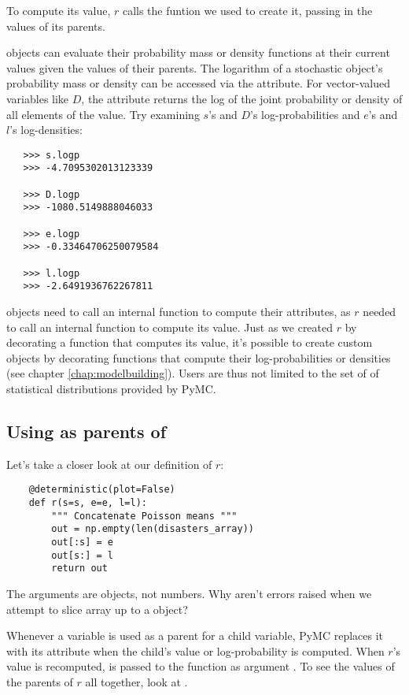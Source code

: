 To compute its value, $r$ calls the funtion we used to create it, passing in the values of its parents.

 objects can evaluate their probability mass or density functions at their current values given the values of their parents. The logarithm of a stochastic object's probability mass or density can be accessed via the  attribute. For vector-valued variables like $D$, the  attribute returns the log of the joint probability or density of all elements of the value. Try examining $s$'s and $D$'s log-probabilities and $e$'s and $l$'s log-densities:
\begin{verbatim}
   >>> s.logp
   >>> -4.7095302013123339

   >>> D.logp
   >>> -1080.5149888046033

   >>> e.logp
   >>> -0.33464706250079584

   >>> l.logp
   >>> -2.6491936762267811
\end{verbatim}
 objects need to call an internal function to compute their  attributes, as $r$ needed to call an internal function to compute its value. Just as we created $r$ by decorating a function that computes its value, it's possible to create custom  objects by decorating functions that compute their log-probabilities or densities (see chapter \ref{chap:modelbuilding}). Users are thus not limited to the set of of statistical distributions provided by PyMC.

\subsection*{Using  as parents of }

Let's take a closer look at our definition of $r$:
\begin{verbatim}
   	@deterministic(plot=False)
	def r(s=s, e=e, l=l):
	    """ Concatenate Poisson means """
	    out = np.empty(len(disasters_array))
	    out[:s] = e
	    out[s:] = l
	    return out
\end{verbatim}
The arguments are  objects, not numbers. Why aren't errors raised when we attempt to slice array  up to a  object?

Whenever a variable is used as a parent for a child variable, PyMC replaces it with its  attribute when the child's value or log-probability is computed. When $r$'s value is recomputed,  is passed to the function as argument . To see the values of the parents of $r$ all together, look at .

